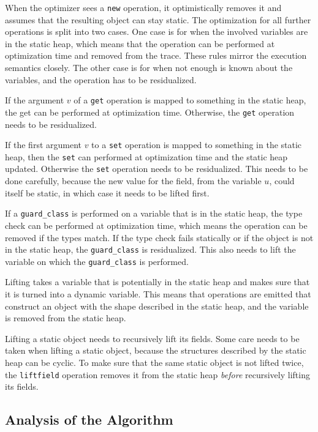 \documentclass{sigplanconf}
\begin{document}
When the optimizer sees a \texttt{new} operation, it optimistically removes it and
assumes that the resulting object can stay static. The optimization for all
further operations is split into two cases. One case is for when the
involved variables are in the static heap, which means that the operation can be
performed at optimization time and removed from the trace. These rules mirror
the execution semantics closely. The other case is for when not enough is known about
the variables, and the operation has to be residualized.

If the argument $v$ of a \texttt{get} operation is mapped to something in the static
heap, the get can be performed at optimization time. Otherwise, the \texttt{get}
operation needs to be residualized.

If the first argument $v$ to a \texttt{set} operation is mapped to something in the
static heap, then the \texttt{set} can performed at optimization time and the static heap
updated. Otherwise the \texttt{set} operation needs to be residualized. This needs to be
done carefully, because the new value for the field, from the variable $u$,
could itself be static, in which case it needs to be lifted first.

If a \texttt{guard\_class} is performed on a variable that is in the static heap, the type check
can be performed at optimization time, which means the operation can be removed
if the types match. If the type check fails statically or if the object is not
in the static heap, the \texttt{guard\_class} is residualized. This also needs to
lift the variable on which the \texttt{guard\_class} is performed.

Lifting takes a variable that is potentially in the static heap and makes sure
that it is turned into a dynamic variable. This means that operations are
emitted that construct an object with the shape described in the
static heap, and the variable is removed from the static heap.

Lifting a static object needs to recursively lift its fields. Some care needs to
be taken when lifting a static object, because the structures described by the
static heap can be cyclic. To make sure that the same static object is not lifted
twice, the \texttt{liftfield} operation removes it from the static heap \emph{before}
recursively lifting its fields.



\subsection{Analysis of the Algorithm}
\label{sub:analysis}
\end{document}
